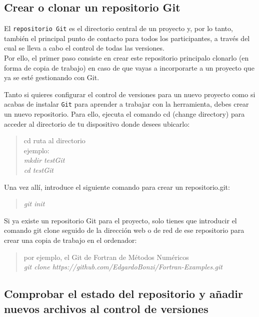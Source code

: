 \documentclass[11pt]{article}
\begin{document}
    \hypertarget{crear-o-clonar-un-repositorio-git}{%
\subsection{Crear o clonar un repositorio
Git}\label{crear-o-clonar-un-repositorio-git}}

El \texttt{repositorio\ Git} es el directorio central de un proyecto y,
por lo tanto, también el principal punto de contacto para todos los
participantes, a través del cual se lleva a cabo el control de todas las
versiones.\\
Por ello, el primer paso consiste en crear este repositorio principalo
clonarlo (en forma de copia de trabajo) en caso de que vayas a
incorporarte a un proyecto que ya se esté gestionando con Git.

Tanto si quieres configurar el control de versiones para un nuevo
proyecto como si acabas de instalar \texttt{Git} para aprender a
trabajar con la herramienta, debes crear un nuevo repositorio. Para
ello, ejecuta el comando cd (change directory) para acceder al
directorio de tu dispositivo donde desees ubicarlo:

\begin{quote}
cd ruta al directorio\\
ejemplo:\\
\emph{mkdir testGit}\\
\emph{cd testGit}
\end{quote}

    Una vez allí, introduce el siguiente comando para crear un
repositorio.git:

\begin{quote}
\emph{git init}
\end{quote}

    Si ya existe un repositorio Git para el proyecto, solo tienes que
introducir el comando git clone seguido de la dirección web o de red de
ese repositorio para crear una copia de trabajo en el ordenador:

\begin{quote}
por ejemplo, el Git de Fortran de Métodos Numéricos\\
\emph{git clone https://github.com/EdgardoBonzi/Fortran-Examples.git}
\end{quote}

    \hypertarget{comprobar-el-estado-del-repositorio-y-auxf1adir-nuevos-archivos-al-control-de-versiones}{%
\subsection{Comprobar el estado del repositorio y añadir nuevos archivos
al control de
versiones}\label{comprobar-el-estado-del-repositorio-y-auxf1adir-nuevos-archivos-al-control-de-versiones}}
\end{document}

